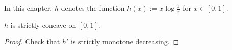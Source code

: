 In this chapter, $h$ denotes the function $h(x) := x \log \frac{1}{x}$ for $x \in [0,1]$.

\begin{lemma}[Concavity]\label{concave}
  $h$ is strictly concave on $[0,1]$.
\end{lemma}

\begin{proof} Check that $h'$ is strictly monotone decreasing.
\end{proof}
